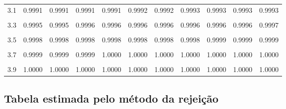 \documentclass[
]{article}
\begin{document}
\begin{longtable}[l]{lcccccccccc}
3.1 & 0.9991 & 0.9991 & 0.9991 & 0.9991 & 0.9992 & 0.9992 & 0.9993 & 0.9993 & 0.9993 & 0.9993\\
\cellcolor{gray!15}{3.2} & \cellcolor{gray!15}{0.9993} & \cellcolor{gray!15}{0.9993} & \cellcolor{gray!15}{0.9994} & \cellcolor{gray!15}{0.9994} & \cellcolor{gray!15}{0.9994} & \cellcolor{gray!15}{0.9994} & \cellcolor{gray!15}{0.9994} & \cellcolor{gray!15}{0.9995} & \cellcolor{gray!15}{0.9995} & \cellcolor{gray!15}{0.9995}\\
3.3 & 0.9995 & 0.9995 & 0.9996 & 0.9996 & 0.9996 & 0.9996 & 0.9996 & 0.9996 & 0.9996 & 0.9997\\
\cellcolor{gray!15}{3.4} & \cellcolor{gray!15}{0.9997} & \cellcolor{gray!15}{0.9997} & \cellcolor{gray!15}{0.9997} & \cellcolor{gray!15}{0.9997} & \cellcolor{gray!15}{0.9997} & \cellcolor{gray!15}{0.9997} & \cellcolor{gray!15}{0.9998} & \cellcolor{gray!15}{0.9998} & \cellcolor{gray!15}{0.9998} & \cellcolor{gray!15}{0.9998}\\
3.5 & 0.9998 & 0.9998 & 0.9998 & 0.9998 & 0.9998 & 0.9998 & 0.9998 & 0.9999 & 0.9999 & 0.9999\\
\cellcolor{gray!15}{3.6} & \cellcolor{gray!15}{0.9999} & \cellcolor{gray!15}{0.9999} & \cellcolor{gray!15}{0.9999} & \cellcolor{gray!15}{0.9999} & \cellcolor{gray!15}{0.9999} & \cellcolor{gray!15}{0.9999} & \cellcolor{gray!15}{0.9999} & \cellcolor{gray!15}{0.9999} & \cellcolor{gray!15}{0.9999} & \cellcolor{gray!15}{0.9999}\\
3.7 & 0.9999 & 0.9999 & 0.9999 & 1.0000 & 1.0000 & 1.0000 & 1.0000 & 1.0000 & 1.0000 & 1.0000\\
\cellcolor{gray!15}{3.8} & \cellcolor{gray!15}{1.0000} & \cellcolor{gray!15}{1.0000} & \cellcolor{gray!15}{1.0000} & \cellcolor{gray!15}{1.0000} & \cellcolor{gray!15}{1.0000} & \cellcolor{gray!15}{1.0000} & \cellcolor{gray!15}{1.0000} & \cellcolor{gray!15}{1.0000} & \cellcolor{gray!15}{1.0000} & \cellcolor{gray!15}{1.0000}\\
3.9 & 1.0000 & 1.0000 & 1.0000 & 1.0000 & 1.0000 & 1.0000 & 1.0000 & 1.0000 & 1.0000 & 1.0000\\*
\end{longtable}

\newpage

\hypertarget{tabela-estimada-pelo-muxe9todo-da-rejeiuxe7uxe3o}{%
\subsection{Tabela estimada pelo método da
rejeição}\label{tabela-estimada-pelo-muxe9todo-da-rejeiuxe7uxe3o}}
\end{document}
